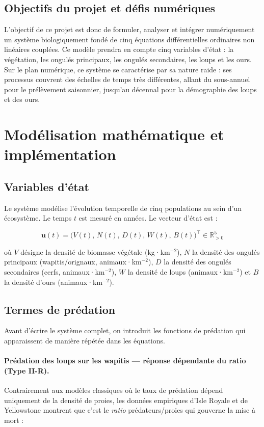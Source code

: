 \documentclass[12pt,a4paper]{article}
\begin{document}
\subsection{Objectifs du projet et défis numériques}
L'objectif de ce projet est donc de formuler, analyser et intégrer numériquement un système biologiquement fondé de cinq équations différentielles ordinaires non linéaires couplées. Ce modèle prendra en compte cinq variables d'état : la végétation, les ongulés principaux, les ongulés secondaires, les loups et les ours. Sur le plan numérique, ce système se caractérise par sa nature raide : ses processus couvrent des échelles de temps très différentes, allant du sous-annuel pour le prélèvement saisonnier, jusqu'au décennal pour la démographie des loups et des ours.


\section{Modélisation mathématique et implémentation}

\subsection{Variables d'état}

Le système modélise l'évolution temporelle de cinq populations au sein d'un écosystème.
Le temps $t$ est mesuré en années. Le vecteur d'état est :

\[
\mathbf{u}(t) = \bigl(V(t),\, N(t),\, D(t),\, W(t),\, B(t)\bigr)^\top \in \mathbb{R}^5_{>0}
\]

où $V$ désigne la densité de biomasse végétale (kg·km$^{-2}$), $N$ la densité des ongulés
principaux (wapitis/orignaux, animaux·km$^{-2}$), $D$ la densité des ongulés secondaires
(cerfs, animaux·km$^{-2}$), $W$ la densité de loups (animaux·km$^{-2}$) et $B$ la densité
d'ours (animaux·km$^{-2}$).

\subsection{Termes de prédation}

Avant d'écrire le système complet, on introduit les fonctions de prédation qui apparaissent
de manière répétée dans les équations.

\paragraph{Prédation des loups sur les wapitis — réponse dépendante du ratio (Type II-R).}
Contrairement aux modèles classiques où le taux de prédation dépend uniquement de la densité
de proies, les données empiriques d'Isle Royale et de Yellowstone montrent que c'est le
\emph{ratio} prédateurs/proies qui gouverne la mise à mort :
\end{document}
